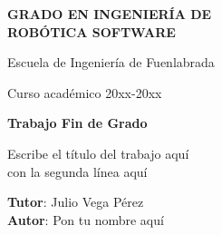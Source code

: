 \thispagestyle{empty}
\vspace{2cm}

\begin{figure}[htb]
  \centerline{}
\end{figure}

\begin{center}
  {\Large {\bf GRADO EN INGENIERÍA DE\\ 
                ROBÓTICA SOFTWARE}}
  \vspace{5mm}
 
  {\large {Escuela de Ingeniería de Fuenlabrada}}
  \vspace{5mm}

  {\large {Curso académico 20xx-20xx}}

  \vspace{1cm}

  {\large {\bf Trabajo Fin de Grado}}

  \vspace{2cm}

  {\Large {Escribe el título del trabajo aquí\\
               con la segunda línea aquí\\[1cm] }}

  \vspace{4cm}
  {\bf Tutor}: Julio Vega Pérez \\
  {\bf Autor}: Pon tu nombre aquí
\end{center}

\clearpage
\thispagestyle{empty}
